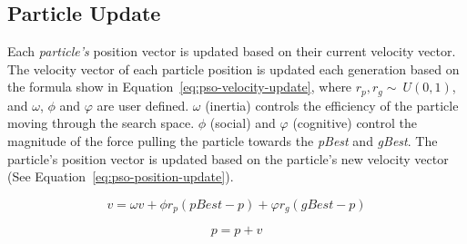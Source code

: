 \subsection{Particle Update}
\label{subsec:pso-position}

Each \textit{particle's} position vector is updated based on their current velocity vector. The velocity vector of each particle position is updated each generation based on the formula show in Equation~\ref{eq:pso-velocity-update}, where $r_p, r_g \sim\ U(0,1)$, and $\omega$, $\phi$ and $\varphi$ are user defined. $\omega$ (inertia) controls the efficiency of the particle moving through the search space. $\phi$ (social) and $\varphi$ (cognitive) control the magnitude of the force pulling the particle towards the \textit{pBest} and \textit{gBest}. The particle's position vector is updated based on the particle's new velocity vector (See Equation~\ref{eq:pso-position-update}).

\begin{equation}
	\label{eq:pso-velocity-update}
	v = \omega{v} + \phi{r_p}(pBest-p) + \varphi{r_g}(gBest-p)
\end{equation}

\begin{equation}
	\label{eq:pso-position-update}
	p = p + v
\end{equation}